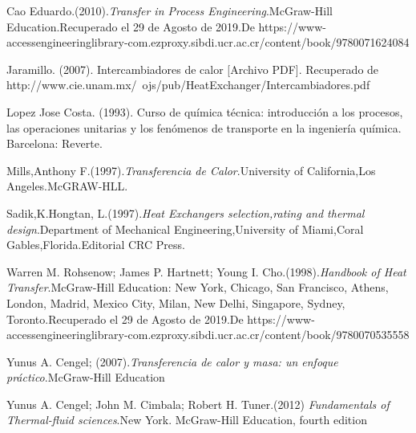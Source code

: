 \documentclass[12pt,letterpaper]{article}     %
\begin{document}
\newpage


\newpage
\begin{thebibliography}{}

Cao Eduardo.(2010).\emph{Transfer in Process Engineering}.McGraw-Hill Education.Recuperado el 29 de Agosto de 2019.De https://www-accessengineeringlibrary-com.ezproxy.sibdi.ucr.ac.cr/content/book/9780071624084

Jaramillo. (2007). Intercambiadores de calor [Archivo PDF]. Recuperado de http://www.cie.unam.mx/~ojs/pub/HeatExchanger/Intercambiadores.pdf

Lopez Jose Costa. (1993). Curso de química técnica: introducción a los procesos, las operaciones unitarias y los fenómenos de transporte en la ingeniería química. Barcelona: Reverte.

Mills,Anthony F.(1997).\emph{Transferencia de Calor}.University of California,Los Angeles.McGRAW-HLL. 

Sadik,K.Hongtan, L.(1997).\emph{Heat Exchangers selection,rating and thermal design}.Department of Mechanical Engineering,University of Miami,Coral Gables,Florida.Editorial CRC Press.

Warren M. Rohsenow; James P. Hartnett; Young I. Cho.(1998).\emph{Handbook of Heat Transfer}.McGraw-Hill Education: New York, Chicago, San Francisco, Athens, London, Madrid, Mexico City, Milan, New Delhi, Singapore, Sydney, Toronto.Recuperado el 29 de Agosto de 2019.De  https://www-accessengineeringlibrary-com.ezproxy.sibdi.ucr.ac.cr/content/book/9780070535558

 Yunus A. Cengel; (2007).\emph{Transferencia de calor y masa: un enfoque práctico}.McGraw-Hill Education
 
 Yunus A. Cengel; John M. Cimbala; Robert H. Tuner.(2012) \emph{Fundamentals of Thermal-fluid sciences}.New York. McGraw-Hill Education, fourth edition


\end{thebibliography}{}


\end{document}
